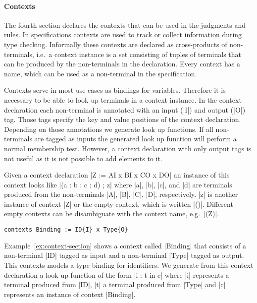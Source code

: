 \paragraph{Contexts} The fourth section declares the contexts that can
be used in the judgments and rules. In specifications contexts are
used to track or collect information during type checking. Informally
these contexts are declared as cross-products of non-terminals, i.e.\
a context instance is a set consisting of tuples of terminals that can
be produced by the non-terminals in the declaration. Every context has
a name, which can be used as a non-terminal in the specification.

Contexts serve in most use cases as bindings for variables. Therefore
it is necessary to be able to look up terminals in a context
instance. In the context declaration each non-terminal is annotated
with an input (\code|{I}|) and output (\code|{O}|) tag. Those tags
specify the key and value positions of the context
declaration. Depending on those annotations we generate look up
functions. If all non-terminals are tagged as inputs the generated
look up function will perform a normal membership test. However, a
context declaration with only output tags is not useful as it is not
possible to add elements to it.

Given a context declaration \code|Z := A{I} x B{I} x C{O} x D{O}| an
instance of this context looks like \code|(a : b : c : d) ; z| where
\code|a|, \code|b|, \code|c|, and \code|d| are terminals produced from
the non-terminals \code|A|, \code|B|, \code|C|, \code|D|,
respectively. \code|z| is another instance of context \code|Z| or the
empty context, which is written \code|()|. Different empty contexts
can be disambiguate with the context name, e.g.\ \code|(Z)|.

\begin{example}
\begin{lstlisting}[language=sltc]
contexts Binding := ID{I} x Type{O}
\end{lstlisting}
\label{ex:context-section}
\end{example}

Example~\ref{ex:context-section} shows a context called \code|Binding|
that consists of a non-terminal \code|ID| tagged as input and a
non-terminal \code|Type| tagged as output. This contexts models a type
binding for identifiers. We generate from this context declaration a
look up function of the form \code|i : t in c| where \code|i|
represents a terminal produced from \code|ID|, \code|t| a terminal
produced from \code|Type| and \code|c| represents an instance of
context \code|Binding|. 

